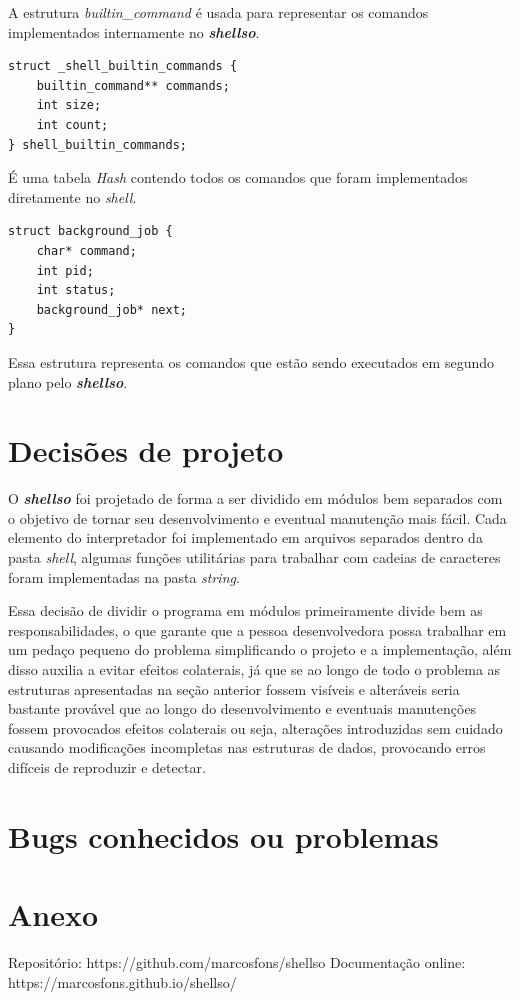 \documentclass[a4paper, 12pt]{article}
\begin{document}
A estrutura \textit{builtin\_command} é usada para representar os comandos implementados
internamente no \textbf{\textit{shellso}}.

\begin{verbatim}
struct _shell_builtin_commands {
    builtin_command** commands;
    int size;
    int count;
} shell_builtin_commands;
\end{verbatim}

É uma tabela \textit{Hash} contendo todos os comandos que foram implementados diretamente
no \textit{shell}.

\begin{verbatim}
struct background_job {
    char* command;
    int pid;
    int status;
    background_job* next;
}
\end{verbatim}

Essa estrutura representa os comandos que estão sendo executados em segundo plano pelo \textbf{\textit{shellso}}.

\newpage

\section{Decisões de projeto}

O \textbf{\textit{shellso}} foi projetado de forma a ser dividido em módulos bem separados
com o objetivo de tornar seu desenvolvimento e eventual manutenção mais fácil. Cada elemento
do interpretador foi implementado em arquivos separados dentro da pasta \textit{shell}, algumas
funções utilitárias para trabalhar com cadeias de caracteres foram implementadas na pasta \textit{string}.

Essa decisão de dividir o programa em módulos primeiramente divide bem as responsabilidades, 
o que garante que a pessoa desenvolvedora possa trabalhar em um pedaço pequeno do problema simplificando
o projeto e a implementação, além disso auxilia a evitar efeitos colaterais, já que se ao
longo de todo o problema as estruturas apresentadas na seção anterior fossem visíveis e 
alteráveis seria bastante provável que ao longo do desenvolvimento e eventuais manutenções
fossem provocados efeitos colaterais ou seja, alterações introduzidas sem cuidado
causando modificações incompletas nas estruturas de dados, provocando erros difíceis de reproduzir e detectar.
 





\newpage

\section{Bugs conhecidos ou problemas}
\newpage

\section*{Anexo}
Repositório: https://github.com/marcosfons/shellso
Documentação online: https://marcosfons.github.io/shellso/
\end{document}
